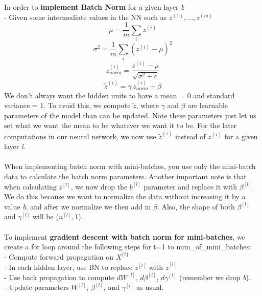 \documentclass[11pt, a4paper]{article}
\begin{document}
\begin{spacing}{1.1}
	\noindent In order to \textbf{implement Batch Norm} for a given layer \textit{l}: \\
	\hspace*{3mm} - Given some intermediate values in the NN such as $z^{(1)},...,z^{(m)}$ \vspace*{.7mm}\\
	$$\mu = \frac{1}{m}\sum_i z^{(i)}$$
	$$\sigma^2 = \frac{1}{m}\sum_i (z^{(i)}-\mu)^2$$
	$$z^{(i)}_{norm} = \frac{z^{(i)}-\mu}{\sqrt{\sigma^2+\epsilon}}$$
	$$\tilde{z}^{(i)} = \gamma\, z^{(i)}_{norm} + \beta $$
	We don't always want the hidden units to have a mean = 0 and standard variance = 1. To avoid this, we compute $\tilde{z}$, where $\gamma$ and $\beta$ are learnable parameters of the model than can be updated. Note these parameters just let us set what we want the mean to be whatever we want it to be. For the later computations in our neural network, we now use $\tilde{z}^{(i)}$ instead of $z^{(i)}$ for a given layer \textit{l}. \\~\\
	When implementing batch norm with mini-batches, you use only the mini-batch data to calculate the batch norm parameters. Another important note is that when calculating $z^{[l]}$, we now drop the $b^{[l]}$ parameter and replace it with $\beta^{[l]}$. We do this because we want to normalize the data without increasing it by a value \textit{b}, and after we normalize we then add in $\beta$. Also, the shape of both $\beta^{[l]}$ and $\gamma^{[l]}$ will be ($n^{[l]}, 1$). \\~\\
	To implement \textbf{gradient descent with batch norm for mini-batches}, we create a for loop around the following steps for t=1 to num\_of\_mini\_batches: \vspace*{.5mm} \\
	\hspace*{3mm} - Compute forward propagation on $X^{\{t\}}$ \\
	\hspace*{7mm} - In each hidden layer, use BN to replace $z^{[l]}$ with $\tilde{z}^{[l]}$ \\
	\hspace*{3mm} - Use back propagation to compute $dW^{[l]}$, $d\beta^{[l]}$, $d\gamma^{[l]}$ (remember we drop \textit{b}). \\
	\hspace*{3mm} - Update parameters $W^{[l]}$, $\beta^{[l]}$, and $\gamma^{[l]}$ as usual. \vspace*{1mm} \\

\end{spacing}
\end{document}
